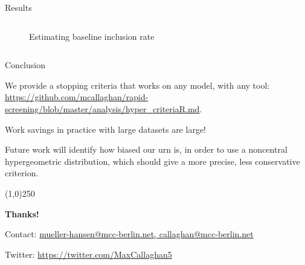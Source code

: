 \documentclass[9pt,aspectratio=169]{beamer}
\begin{document}
\begin{frame}{Results}
\begin{columns}
\begin{column}{0.382\linewidth}
\begin{figure}
{				\caption{Estimating baseline inclusion rate}
			}

		\end{figure}
	\end{column}
\end{columns}


\end{frame}


\begin{frame}{Conclusion}

We provide a stopping criteria that works on any model, with any tool: \url{https://github.com/mcallaghan/rapid-screening/blob/master/analysis/hyper_criteriaR.md}.

\medskip

Work savings in practice with large datasets are large!

\medskip

Future work will identify how biased our urn is, in order to use a noncentral hypergeometric distribution, which should give a more precise, less conservative criterion.

\begin{center}
	\line(1,0){250}
	
	\medskip
	
	\textbf{Thanks!}
	
	\medskip
	
	Contact: \url{mueller-hansen@mcc-berlin.net, callaghan@mcc-berlin.net}
	
	Twitter: \url{https://twitter.com/MaxCallaghan5}
	
\end{center}

\end{frame}
\end{document}
